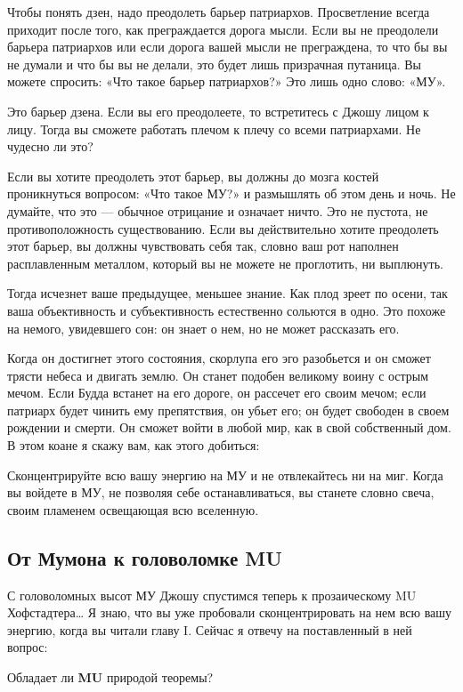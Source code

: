 \documentclass[../main.tex]{subfiles}
\begin{document}
Чтобы понять дзен, надо преодолеть барьер патриархов. Просветление всегда приходит после того, как преграждается дорога мысли. Если вы не преодолели барьера патриархов или если дорога вашей мысли не преграждена, то что бы вы не думали и что бы вы не делали, это будет лишь призрачная путаница. Вы можете спросить: «Что такое барьер патриархов?» Это лишь одно слово: «МУ».

Это барьер дзена. Если вы его преодолеете, то встретитесь с Джошу лицом к лицу. Тогда вы сможете работать плечом к плечу со всеми патриархами. Не чудесно ли это?

Если вы хотите преодолеть этот барьер, вы должны до мозга костей проникнуться вопросом: «Что такое МУ?» и размышлять об этом день и ночь. Не думайте, что это --- обычное отрицание и означает ничто. Это не пустота, не противоположность существованию. Если вы действительно хотите преодолеть этот барьер, вы должны чувствовать себя так, словно ваш рот наполнен расплавленным металлом, который вы не можете не проглотить, ни выплюнуть.

Тогда исчезнет ваше предыдущее, меньшее знание. Как плод зреет по осени, так ваша объективность и субъективность естественно сольются в одно. Это похоже на немого, увидевшего сон: он знает о нем, но не может рассказать его.

Когда он достигнет этого состояния, скорлупа его эго разобьется и он сможет трясти небеса и двигать землю. Он станет подобен великому воину с острым мечом. Если Будда встанет на его дороге, он рассечет его своим мечом; если патриарх будет чинить ему препятствия, он убьет его; он будет свободен в своем рождении и смерти. Он сможет войти в любой мир, как в свой собственный дом. В этом коане я скажу вам, как этого добиться:

Сконцентрируйте всю вашу энергию на МУ и не отвлекайтесь ни на миг. Когда вы войдете в МУ, не позволяя себе останавливаться, вы станете словно свеча, своим пламенем освещающая всю вселенную.


\subsection{От Мумона к головоломке MU}

С головоломных высот МУ Джошу спустимся теперь к прозаическому MU Хофстадтера\ldots{} Я знаю, что вы уже пробовали сконцентрировать на нем всю вашу энергию, когда вы читали главу I. Сейчас я отвечу на поставленный в ней вопрос:

Обладает ли \textbf{MU} природой теоремы?
\end{document}
